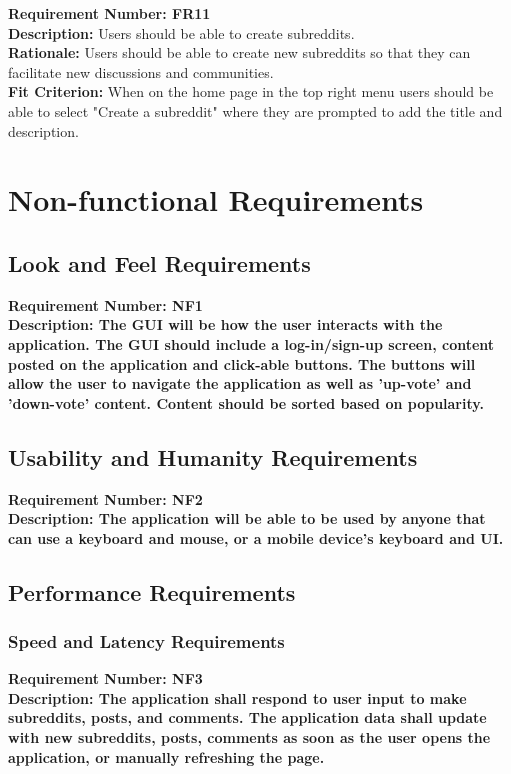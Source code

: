 \documentclass[12pt,fleqn]{article}
\begin{document}
\begin{tcolorbox}
\textbf{Requirement Number: FR11} \\
\textbf{Description:} Users should be able to create subreddits.\\
\textbf{Rationale:} Users should be able to create new subreddits so that they can facilitate new discussions and communities.\\
\textbf{Fit Criterion:} When on the home page in the top right menu users should be able to select "Create a subreddit" where they are prompted to add the title and description.
\end{tcolorbox}

\pagebreak
\section {Non-functional Requirements}

\subsection {Look and Feel Requirements}
\begin{tcolorbox}
\textbf{Requirement Number: NF1} \\
\textbf{Description:
 The GUI will be how the user interacts with the application.  The GUI should include a log-in/sign-up screen, content posted on the application and click-able buttons.  The buttons will allow the user to navigate the application as well as 'up-vote' and 'down-vote' content.  Content should be sorted based on popularity.  }  
\end{tcolorbox}

\subsection {Usability and Humanity Requirements}
\begin{tcolorbox}
\textbf{Requirement Number: NF2} \\
\textbf{Description:
The application will be able to be used by anyone that can use a keyboard and mouse, or a mobile device's keyboard and UI.}
\end{tcolorbox}

\subsection {Performance Requirements}
\subsubsection {Speed and Latency Requirements}
\begin{tcolorbox}
\textbf{Requirement Number: NF3} \\
\textbf{Description:
The application shall respond to user input to make subreddits, posts, and comments. The application data shall update with new subreddits, posts, comments as soon as the user opens the application, or manually refreshing the page.}
\end{tcolorbox}
\end{document}
